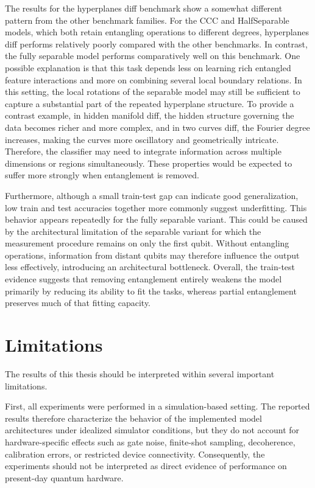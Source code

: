 \documentclass[12pt,a4paper,openany]{report}
\begin{document}
The results for the hyperplanes diff benchmark show a somewhat different pattern from the other benchmark families. For the CCC and HalfSeparable models, which both retain entangling operations to different degrees, hyperplanes diff performs relatively poorly compared with the other benchmarks. In contrast, the fully separable model performs comparatively well on this benchmark. One possible explanation is that this task depends less on learning rich entangled feature interactions and more on combining several local boundary relations. In this setting, the local rotations of the separable model may still be sufficient to capture a substantial part of the repeated hyperplane structure. To provide a contrast example, in hidden manifold diff, the hidden structure governing the data becomes richer and more complex, and in two curves diff, the Fourier degree increases, making the curves more oscillatory and geometrically intricate. Therefore, the classifier may need to integrate information across multiple dimensions or regions simultaneously. These properties would be expected to suffer more strongly when entanglement is removed.

Furthermore, although a small train-test gap can indicate good generalization, low train and test accuracies together more commonly suggest underfitting. This behavior appears repeatedly for the fully separable variant. This could be caused by the architectural limitation of the separable variant for which the measurement procedure remains on only the first qubit. Without entangling operations, information from distant qubits may therefore influence the output less effectively, introducing an architectural bottleneck. Overall, the train-test evidence suggests that removing entanglement entirely weakens the model primarily by reducing its ability to fit the tasks, whereas partial entanglement preserves much of that fitting capacity.

\section{Limitations} 
The results of this thesis should be interpreted within several important limitations. 

First, all experiments were performed in a simulation-based setting. The reported results therefore characterize the behavior of the implemented model architectures under idealized simulator conditions, but they do not account for hardware-specific effects such as gate noise, finite-shot sampling, decoherence, calibration errors, or restricted device connectivity. Consequently, the experiments should not be interpreted as direct evidence of performance on present-day quantum hardware. 
\end{document}

